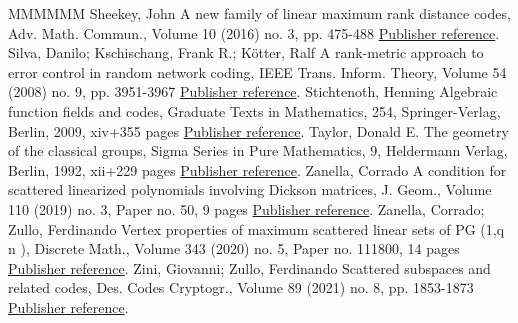 \begin{thebibliography}{MMMMMM}
 Sheekey, John A new family of linear maximum rank distance codes, Adv. Math. Commun., Volume 10 (2016) no. 3, pp. 475-488 \href{https://alco.centre-mersenne.org/articles/10.5802/alco.377/#sheekey2016new}{Publisher reference}.
 Silva, Danilo; Kschischang, Frank R.; Kötter, Ralf A rank-metric approach to error control in random network coding, IEEE Trans. Inform. Theory, Volume 54 (2008) no. 9, pp. 3951-3967 \href{https://alco.centre-mersenne.org/articles/10.5802/alco.377/#MR2450762}{Publisher reference}.
 Stichtenoth, Henning Algebraic function fields and codes, Graduate Texts in Mathematics, 254, Springer-Verlag, Berlin, 2009, xiv+355 pages \href{https://alco.centre-mersenne.org/articles/10.5802/alco.377/#Stichtenoth}{Publisher reference}.
 Taylor, Donald E. The geometry of the classical groups, Sigma Series in Pure Mathematics, 9, Heldermann Verlag, Berlin, 1992, xii+229 pages \href{https://alco.centre-mersenne.org/articles/10.5802/alco.377/#taylor1992geometry}{Publisher reference}.
 Zanella, Corrado A condition for scattered linearized polynomials involving Dickson matrices, J. Geom., Volume 110 (2019) no. 3, Paper no. 50, 9 pages \href{https://alco.centre-mersenne.org/articles/10.5802/alco.377/#zanella2019condition}{Publisher reference}.
 Zanella, Corrado; Zullo, Ferdinando Vertex properties of maximum scattered linear sets of  PG (1,q n ), Discrete Math., Volume 343 (2020) no. 5, Paper no. 111800, 14 pages \href{https://alco.centre-mersenne.org/articles/10.5802/alco.377/#zanella2020vertex}{Publisher reference}.
 Zini, Giovanni; Zullo, Ferdinando Scattered subspaces and related codes, Des. Codes Cryptogr., Volume 89 (2021) no. 8, pp. 1853-1873 \href{https://alco.centre-mersenne.org/articles/10.5802/alco.377/#zini2021scattered}{Publisher reference}.
\end{thebibliography}
